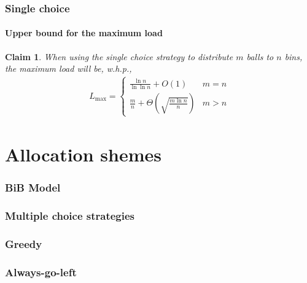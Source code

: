 \documentclass{beamer}
\newcommand\load{L_{\mathrm{max}}}
\newtheorem{claim}{Claim}
\begin{document}
\begin{frame}
\frametitle{Single choice}
\framesubtitle{Upper bound for the maximum load}
\begin{claim}
When using the single choice strategy to distribute $m$ balls to $n$ bins, the maximum load will be, w.h.p.,
\begin{align}
\load = 
	\begin{cases}
    \frac{\ln n}{\ln\ln n} + O(1)              & m = n \\
    \frac{m}{n} + \Theta\left(\sqrt{\frac{m\ln n}{n}} \right)              & m > n
    \end{cases}
\end{align}
\end{claim}
\end{frame}

\begin{comment}
\begin{frame}
\frametitle{Applications}
\begin{itemize}
	\item Hashing
	\item Online load balancing
	\item Emulating PRAMs on DMMs
	\item Low congestion circuit routing
\end{itemize}
\end{frame}
\end{comment}


\section{Allocation shemes}
\begin{frame}
\frametitle{BiB Model}
\end{frame}

\begin{frame}
\frametitle{Multiple choice strategies}
\end{frame}

\begin{frame}
\frametitle{Greedy}
\end{frame}

\begin{frame}
\frametitle{Always-go-left}
\end{frame}
\end{document}
